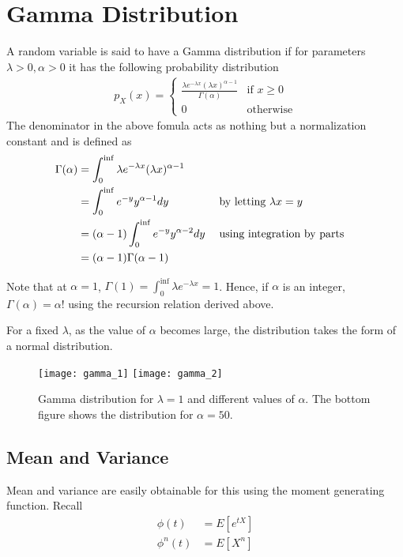 \documentclass[../probability-notes.tex]{subfiles}
\begin{document}
    \section{Gamma Distribution}
    A random variable is said to have a Gamma distribution if for parameters $\lambda > 0, \alpha > 0$ it has the following probability distribution
    \begin{align*}
        p_{X}(x) = \begin{cases} 
            \frac{\lambda e^{-\lambda x} (\lambda x)^{\alpha - 1}}{\Gamma(\alpha)} &\mbox{if $x \geq 0$}\\
            0 &\mbox{otherwise}
        \end{cases}
    \end{align*}
    The denominator in the above fomula acts as nothing but a normalization constant and is defined as
    \begin{alignat*}{2}
        \Gamma (\alpha) &= \int_{0}^{\inf} \lambda e^{-\lambda x} (\lambda x)^{\alpha - 1}\\
        &= \int_{0}^{\inf} e^{-y} y^{\alpha - 1} dy &&\text{\;by letting $\lambda x = y$}\\
        &= (\alpha - 1) \int_{0}^{\inf} e^{-y} y^{\alpha - 2} dy &&\text{\;using integration by parts}\\
        &= (\alpha - 1) \Gamma (\alpha - 1)
    \end{alignat*}

    Note that at $\alpha = 1$, $\Gamma (1) = \int_{0}^{\inf} \lambda e^{-\lambda x} = 1$. Hence, if $\alpha$ is an integer, $\Gamma(\alpha) = \alpha !$ using the recursion relation derived above.\newline

    For a fixed $\lambda$, as the value of $\alpha$ becomes large, the distribution takes the form of a normal distribution.

    \begin{figure}[h]
    \texttt{[image: gamma\_1]}
    \texttt{[image: gamma\_2]}
    \centering
    \caption{Gamma distribution for $\lambda = 1$ and different values of $\alpha$. The bottom figure shows the distribution for $\alpha = 50$.}
    \label{fig:gamma_1} %
    \end{figure}

    \subsection{Mean and Variance}
    Mean and variance are easily obtainable for this using the moment generating function. Recall
    \begin{align*}
        \phi(t) &= E[e^{tX}]\\
        \phi^{n}(t) &= E[X^{n}]
    \end{align*}
\end{document}
